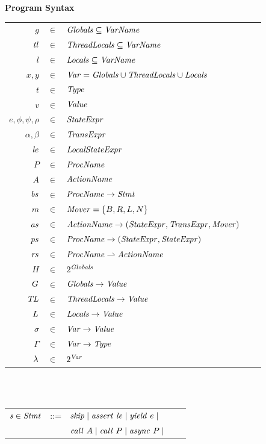 \begin{figure}
\setlength{\tabcolsep}{3pt}
{\bf Program Syntax} \\
\begin{tabular}{rclcl}
$g$ & $\in$ & $\mathit{Globals} \subseteq \mathit{VarName}$ \\
$\mathit{tl}$ & $\in$ & $\mathit{ThreadLocals} \subseteq \mathit{VarName}$ \\
$l$ & $\in$ & $\mathit{Locals} \subseteq \mathit{VarName}$ \\
$x,y$ & $\in$ & $\mathit{Var} = \mathit{Globals} \cup \mathit{ThreadLocals} \cup \mathit{Locals}$ \\
$t$ & $\in$ & $\mathit{Type}$ \\
$v$ &  $\in$ & $\mathit{Value}$ \\
$e, \phi, \psi, \rho$ & $\in$ & $\mathit{StateExpr}$ \\
$\alpha, \beta$ & $\in$ & $\mathit{TransExpr}$ \\
$\mathit{le}$ & $\in$ & $\mathit{LocalStateExpr}$ \\
$P$ & $\in$ & $\mathit{ProcName}$ \\
$A$ & $\in$ & $\mathit{ActionName}$ \\
$\mathit{bs}$ & $\in$ & $\mathit{ProcName} \rightarrow \mathit{Stmt}$ \\
$m$ & $\in$ & $\mathit{Mover} = \{B,R,L,N\}$\\
$\mathit{as}$ & $\in$ & $\mathit{ActionName} \rightarrow (\mathit{StateExpr}, \mathit{TransExpr}, \mathit{Mover})$ \\
$\mathit{ps}$ & $\in$ & $\mathit{ProcName} \rightarrow (\mathit{StateExpr}, \mathit{StateExpr})$ \\
$\mathit{rs}$ & $\in$ & $\mathit{ProcName} \rightharpoonup \mathit{ActionName}$ \\
$H$ & $\in$ & $2^{\mathit{Globals}}$ \\
$G$ & $\in$ & $ \mathit{Globals} \rightarrow \mathit{Value}$ \\
$\mathit{TL}$ & $\in$ & $ \mathit{ThreadLocals}  \rightarrow \mathit{Value}$ \\
$L$ & $\in$ & $ \mathit{Locals} \rightarrow \mathit{Value}$ \\
$\sigma$ & $\in$ & $ \mathit{Var} \rightarrow \mathit{Value}$ \\
$\Gamma$ & $\in$ & $ \mathit{Var} \rightarrow \mathit{Type}$ \\
$\lambda$ & $\in$ & $2^{\mathit{Var}}$ \\
\end{tabular}
~\\
~\\
\begin{tabular}{rclcl}
$\mathit{s} \in \mathit{Stmt}$ &::= & $\mathit{skip} \mid \mathit{assert}\ \mathit{le} \mid \mathit{yield}\ e \mid$ \\
                  & & $\mathit{call}\ A \mid \mathit{call}\ P \mid \mathit{async}\ P \mid $\\

\end{tabular}
\end{figure}
